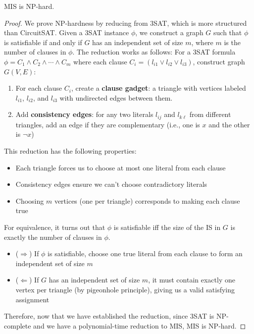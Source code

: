 \documentclass{article}
\begin{document}
      \begin{theorem}
        MIS is NP-hard.
      \end{theorem}
      \begin{proof}
        We prove NP-hardness by reducing from 3SAT, which is more structured than CircuitSAT. Given a 3SAT instance $\phi$, we construct a graph $G$ such that $\phi$ is satisfiable if and only if $G$ has an independent set of size $m$, where $m$ is the number of clauses in $\phi$. The reduction works as follows: For a 3SAT formula $\phi = C_1 \land C_2 \land \cdots \land C_m$ where each clause $C_i = (l_{i1} \lor l_{i2} \lor l_{i3})$, construct graph $G(V,E)$:

        \begin{enumerate}
          \item For each clause $C_i$, create a \textbf{clause gadget}: a triangle with vertices labeled $l_{i1}$, $l_{i2}$, and $l_{i3}$ with undirected edges between them. 
          \item Add \textbf{consistency edges}: for any two literals $l_{ij}$ and $l_{k\ell}$ from different triangles, add an edge if they are complementary (i.e., one is $x$ and the other is $\neg x$)
        \end{enumerate}

        This reduction has the following properties:
        \begin{itemize}
          \item Each triangle forces us to choose at most one literal from each clause
          \item Consistency edges ensure we can't choose contradictory literals
          \item Choosing $m$ vertices (one per triangle) corresponds to making each clause true
        \end{itemize}

        For equivalence, it turns out that $\phi$ is satisfiable iff the size of the IS in $G$ is exactly the number of clauses in $\phi$. 
        \begin{itemize}
          \item ($\Rightarrow$) If $\phi$ is satisfiable, choose one true literal from each clause to form an independent set of size $m$
          \item ($\Leftarrow$) If $G$ has an independent set of size $m$, it must contain exactly one vertex per triangle (by pigeonhole principle), giving us a valid satisfying assignment
        \end{itemize}

        Therefore, now that we have established the reduction, since 3SAT is NP-complete and we have a polynomial-time reduction to MIS, MIS is NP-hard.
      \end{proof}
\end{document}
